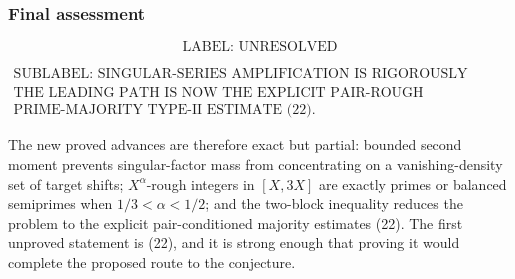 \subsubsection*{Final assessment}

\[
\boxed{\text{LABEL: UNRESOLVED}}
\]

\[
\boxed{
\begin{array}{c}
\text{SUBLABEL: SINGULAR-SERIES AMPLIFICATION IS RIGOROUSLY RULED OUT;}\\
\text{THE LEADING PATH IS NOW THE EXPLICIT PAIR-ROUGH}\\
\text{PRIME-MAJORITY TYPE-II ESTIMATE (22).}
\end{array}
}
\]

The new proved advances are therefore exact but partial: bounded second moment prevents singular-factor mass from concentrating on a vanishing-density set of target shifts; \(X^\alpha\)-rough integers in \([X,3X]\) are exactly primes or balanced semiprimes when \(1/3<\alpha<1/2\); and the two-block inequality reduces the problem to the explicit pair-conditioned majority estimates (22). The first unproved statement is (22), and it is strong enough that proving it would complete the proposed route to the conjecture.
